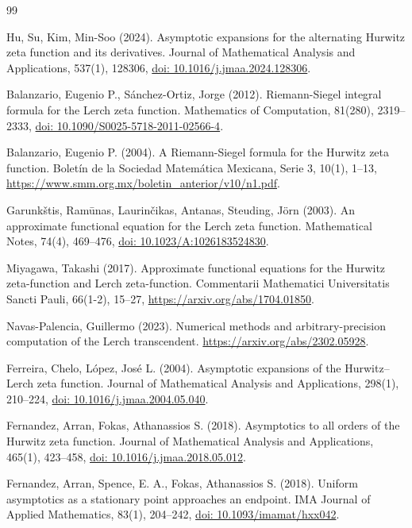 \documentclass[11pt,a4paper]{article}
\begin{document}
\begin{thebibliography}{99}
\small\raggedright
\setlength{\itemsep}{4pt plus 1pt minus 1pt}
 Hu, Su, Kim, Min-Soo (2024). Asymptotic expansions for the alternating Hurwitz zeta function and its derivatives. Journal of Mathematical Analysis and Applications, 537(1), 128306, \href{https://doi.org/10.1016/j.jmaa.2024.128306}{doi: 10.1016/j.jmaa.2024.128306}.

 Balanzario, Eugenio P., Sánchez-Ortiz, Jorge (2012). Riemann-Siegel integral formula for the Lerch zeta function. Mathematics of Computation, 81(280), 2319--2333, \href{https://doi.org/10.1090/S0025-5718-2011-02566-4}{doi: 10.1090/S0025-5718-2011-02566-4}.

 Balanzario, Eugenio P. (2004). A Riemann-Siegel formula for the Hurwitz zeta function. Boletín de la Sociedad Matemática Mexicana, Serie 3, 10(1), 1--13, \url{https://www.smm.org.mx/boletin_anterior/v10/n1.pdf}.

 Garunkštis, Ramūnas, Laurinčikas, Antanas, Steuding, Jörn (2003). An approximate functional equation for the Lerch zeta function. Mathematical Notes, 74(4), 469--476, \href{https://doi.org/10.1023/A:1026183524830}{doi: 10.1023/A:1026183524830}.

 Miyagawa, Takashi (2017). Approximate functional equations for the Hurwitz zeta-function and Lerch zeta-function. Commentarii Mathematici Universitatis Sancti Pauli, 66(1-2), 15--27, \url{https://arxiv.org/abs/1704.01850}.

 Navas-Palencia, Guillermo (2023). Numerical methods and arbitrary-precision computation of the Lerch transcendent. \url{https://arxiv.org/abs/2302.05928}.

 Ferreira, Chelo, López, José L. (2004). Asymptotic expansions of the Hurwitz--Lerch zeta function. Journal of Mathematical Analysis and Applications, 298(1), 210--224, \href{https://doi.org/10.1016/j.jmaa.2004.05.040}{doi: 10.1016/j.jmaa.2004.05.040}.

 Fernandez, Arran, Fokas, Athanassios S. (2018). Asymptotics to all orders of the Hurwitz zeta function. Journal of Mathematical Analysis and Applications, 465(1), 423--458, \href{https://doi.org/10.1016/j.jmaa.2018.05.012}{doi: 10.1016/j.jmaa.2018.05.012}.

 Fernandez, Arran, Spence, E. A., Fokas, Athanassios S. (2018). Uniform asymptotics as a stationary point approaches an endpoint. IMA Journal of Applied Mathematics, 83(1), 204--242, \href{https://doi.org/10.1093/imamat/hxx042}{doi: 10.1093/imamat/hxx042}.


\end{thebibliography}
\end{document}
